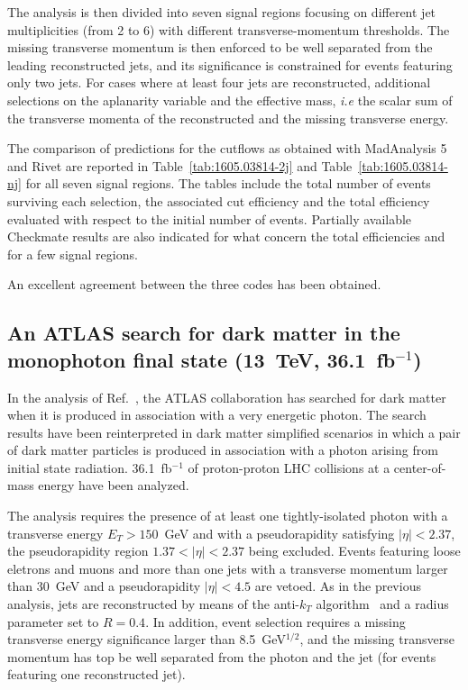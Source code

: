 \documentclass[11pt]{cernrep}
\begin{document}
The analysis is then divided into seven signal regions focusing on different jet
multiplicities (from 2 to 6) with different transverse-momentum thresholds. The
missing transverse momentum is then enforced to be well separated from the
leading reconstructed jets, and its significance is constrained for events
featuring only two jets. For cases where at least four jets are reconstructed,
additional selections on the aplanarity variable
and the effective mass, {\it i.e} the scalar sum of the transverse momenta of the
reconstructed and the missing transverse energy.

The comparison of
predictions for the cutflows as obtained with MadAnalysis 5 and Rivet are
reported in Table~\ref{tab:1605.03814-2j} and Table~\ref{tab:1605.03814-nj} for
all seven signal regions. The tables include the total number of events
surviving each selection, the associated cut efficiency and the total efficiency
evaluated with respect to the initial number of events. Partially available
Checkmate results are also indicated for what concern the total efficiencies and
for a few signal regions.

An excellent agreement between the three codes has been obtained.

\subsection{An ATLAS search for dark matter in the monophoton final state
  (13~TeV,  36.1~fb$^{-1}$)}

In the analysis of Ref.~\cite{Aaboud:2017dor}, the ATLAS collaboration has
searched for dark matter when it is produced in association with a very
energetic photon. The search results have been reinterpreted in dark matter
simplified scenarios in which a pair of dark matter particles is produced in
association with a photon arising from initial state radiation. 36.1~fb$^{-1}$
of proton-proton LHC collisions at a center-of-mass energy have been analyzed.

The analysis requires the presence of at least one tightly-isolated photon with
a transverse energy $E_T > 150$~GeV and with a pseudorapidity satisfying
$|\eta| < 2.37$, the pseudorapidity region $1.37 < |\eta| < 2.37$ being
excluded. Events featuring loose eletrons and muons and more than one jets with
a transverse momentum larger than 30~GeV and a pseudorapidity $|\eta|<4.5$ are
vetoed. As in the previous analysis, jets are reconstructed by means of the
anti-$k_T$ algorithm~\cite{Cacciari:2008gp}  and a radius parameter set to
$R=0.4$. In addition, event selection requires a missing transverse energy
significance larger than 8.5~GeV$^{1/2}$, and the missing transverse momentum
has top be well separated from the photon and the jet (for events featuring one
reconstructed jet).
\end{document}
